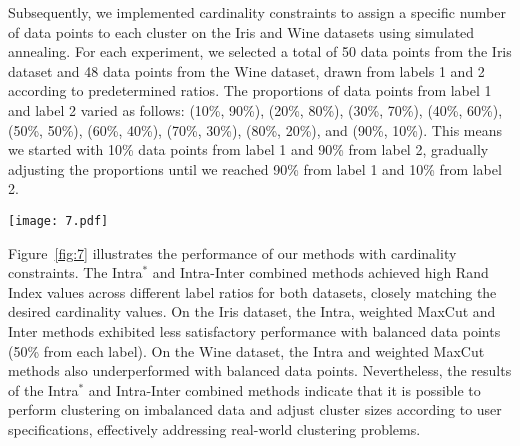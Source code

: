 \documentclass[showpacs,twocolumn,superscriptaddress]{revtex4-2}
\begin{document}
Subsequently, we implemented cardinality constraints to assign a specific number of data points to each cluster on the Iris and Wine datasets using simulated annealing. For each experiment, we selected a total of 50 data points from the Iris dataset and 48 data points from the Wine dataset, drawn from labels 1 and 2 according to predetermined ratios. The proportions of data points from label 1 and label 2 varied as follows: (10\%, 90\%), (20\%, 80\%), (30\%, 70\%), (40\%, 60\%), (50\%, 50\%), (60\%, 40\%), (70\%, 30\%), (80\%, 20\%), and (90\%, 10\%). This means we started with 10\% data points from label 1 and 90\% from label 2, gradually adjusting the proportions until we reached 90\% from label 1 and 10\% from label 2.
\begin{figure*}[!ht]
    \texttt{[image: 7.pdf]}
    \caption{The top plots show the Rand Index across various methods with cardinality constraints applied to the Iris (left) and Wine (right) datasets. The bottom plots depict the difference between the given cardinality ($C$) and the experimental results ($C^*$). The horizontal axis represents the number of data points from label 1 to label 2, ranging from (10\%, 90\%) to (90\%, 10\%). Notice that the Inter method underperformed on the Iris dataset. In contrast, the Intra$^*$ and Intra-Inter combined methods maintained a high Rand Index while closely achieving the desired cardinality.}
    \label{fig:7}
\end{figure*}

Figure~\ref{fig:7} illustrates the performance of our methods with cardinality constraints. The Intra$^*$ and Intra-Inter combined methods achieved high Rand Index values across different label ratios for both datasets, closely matching the desired cardinality values. On the Iris dataset, the Intra, weighted MaxCut and Inter methods exhibited less satisfactory performance with balanced data points (50\% from each label). On the Wine dataset, the Intra and weighted MaxCut methods also underperformed with balanced data points. Nevertheless, the results of the Intra$^*$ and Intra-Inter combined methods indicate that it is possible to perform clustering on imbalanced data and adjust cluster sizes according to user specifications, effectively addressing real-world clustering problems.
\end{document}
